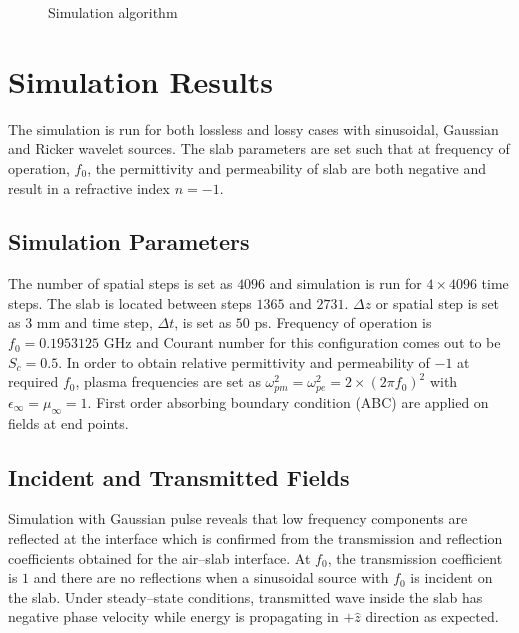 \begin{figure}[htbp]
\caption{Simulation algorithm}
\label{1D-DNG-Algorithm}
\end{figure}
\section{Simulation Results}
The simulation is run for both lossless and lossy cases with sinusoidal, Gaussian and Ricker wavelet sources. The slab parameters are set such that at frequency of operation, $f_0$, the permittivity and permeability of slab are both negative and result in a refractive index $n=-1$.
\subsection{Simulation Parameters}
The number of spatial steps is set as $4096$ and simulation is run for $4\times 4096$ time steps. The slab is located between steps $1365$ and $2731$. $\Delta z$ or spatial step is set as $3$ mm and time step, $\Delta t$, is set as $50$ ps. Frequency of operation is $f_0=0.1953125$ GHz and Courant number for this configuration comes out to be $S_c=0.5$. In order to obtain relative permittivity and permeability of $-1$ at required $f_0$, plasma frequencies are set as $\omega^2_{pm}=\omega^2_{pe}=2\times(2\pi f_0)^2$ with $\epsilon_\infty=\mu_\infty=1$. First order absorbing boundary condition (ABC) are applied on fields at end points.
\subsection{Incident and Transmitted Fields}
Simulation with Gaussian pulse reveals that low frequency components are reflected at the interface which is confirmed from the transmission and reflection coefficients obtained for the air--slab interface. At $f_0$, the transmission coefficient is $1$ and there are no reflections when a sinusoidal source with $f_0$ is incident on the slab. Under steady--state conditions, transmitted wave inside the slab has negative phase velocity while energy is propagating in $+\hat{z}$ direction as expected.

